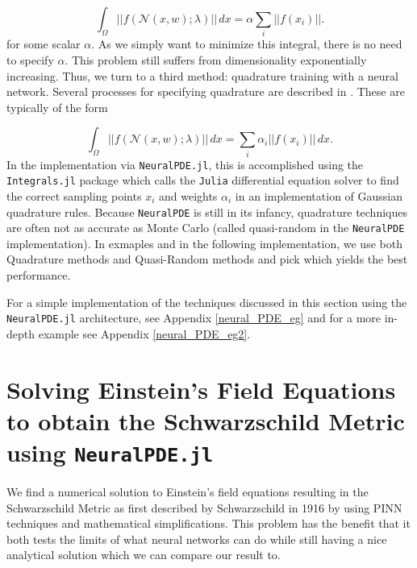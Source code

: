 \documentclass{CUP-JNL-DTM}%
\theoremstyle{definition}
\numberwithin{equation}{section}
\newcommand{\Julia}{\texttt{Julia} }
\newcommand{\net}{\mathcal{N}}
\begin{document}
\begin{equation}
	\int_{\Omega} ||f(\net(x,w); \lambda)||\,dx = \alpha \sum_i ||f(x_i)||.
\end{equation}
for some scalar $\alpha$. As we simply want to minimize this integral, there is no need to specify $\alpha$. This problem still suffers from dimensionality exponentially increasing. Thus, we turn to a third method: quadrature training with a neural network. Several processes for specifying quadrature are described in \cite{riveraQuadratureRulesSolving2022}. These are typically of the form 

\begin{equation}
	\int_{\Omega} ||f(\net(x,w); \lambda)||\,dx = \sum_i \alpha_i ||f(x_i)||\,dx.
\end{equation}
In the implementation via \texttt{NeuralPDE.jl}, this is accomplished using the \texttt{Integrals.jl} package which calls the \Julia differential equation solver \cite{rackauckasDifferentialEquationsJlPerformant2017} to find the correct sampling points $x_i$ and weights $\alpha_i$ in an implementation of Gaussian quadrature rules. Because \texttt{NeuralPDE} is still in its infancy, quadrature techniques are often not as accurate as Monte Carlo (called quasi-random in the \texttt{NeuralPDE} implementation). In exmaples and in the following implementation, we use both Quadrature methods and Quasi-Random methods and pick which yields the best performance. 

For a simple implementation of the techniques discussed in this section using the \texttt{NeuralPDE.jl} architecture, see Appendix \ref{neural_PDE_eg} and for a more in-depth example see Appendix \ref{neural_PDE_eg2}. 


\section{Solving Einstein's Field Equations to obtain the Schwarzschild Metric using \texttt{NeuralPDE.jl}}
\label{sec:EFE}

We find a numerical solution to Einstein's field equations resulting in the Schwarzschild Metric as first described by Schwarzschild in 1916 \cite{schwarzschildGravitationalFieldMass1999} by using PINN techniques and mathematical simplifications. This problem has the benefit that it both tests the limits of what neural networks can do while still having a nice analytical solution which we can compare our result to.  
\end{document}
